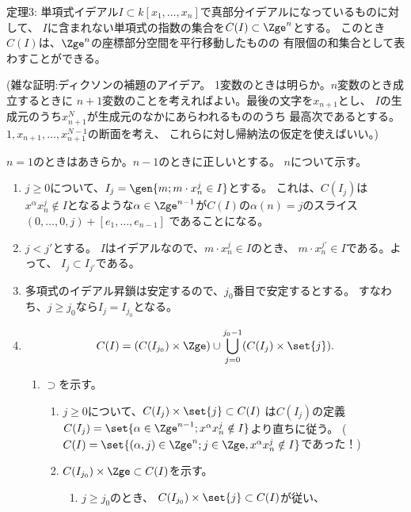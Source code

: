 \begin{framed}
  定理3:
  単項式イデアル$I\subset k[x_1,\dots,x_n]$で真部分イデアルになっているものに対して、
  $I$に含まれない単項式の指数の集合を$C(I) \subset \Zge^n$とする。
  このとき$C(I)$は、$\Zge^n$の座標部分空間を平行移動したものの
  有限個の和集合として表わすことができる。
\end{framed}
(雑な証明:ディクソンの補題のアイデア。
1変数のときは明らか。$n$変数のとき成立するときに
$n+1$変数のことを考えればよい。最後の文字を$x_{n+1}$とし、
$I$の生成元のうち$x_{n+1}^N$が生成元のなかにあらわれるもののうち
最高次であるとする。$1,x_{n+1},\dots, x_{n+1}^{N-1}$の断面を考え、
これらに対し帰納法の仮定を使えばいい。)
\begin{myproof}
  $n=1$のときはあきらか。$n-1$のときに正しいとする。
  $n$について示す。

  \begin{enumerate}
    \item $j\ge 0$について、$I_j = \gen{m; m\cdot x_n^j \in I}$とする。
    これは、$C(I_j)$は$x^\alpha x_n^j \notin I$となるような$\alpha \in \Zge^{n-1}$が$C(I)$の$\alpha(n) = j$のスライス
    $(0,\dots,0,j) + [e_1,\dots,e_{n-1}]$
    であることになる。
    \item $j < j'$とする。
    $I$はイデアルなので、$m\cdot x_n^j \in I$のとき、
    $m\cdot x_n^{j'} \in I$である。よって、
    $I_j \subset I_{j'}$である。
    \item
    多項式のイデアル昇鎖は安定するので、$j_0$番目で安定するとする。
    すなわち、$j\ge j_0$なら$I_j = I_{j_0}$となる。
    \item
    \begin{align}
      C(I) = (C(I_{j_0})\times \Zge) \cup \bigcup_{j=0}^{j_0-1}(C(I_j)\times \set{j}).
    \end{align}
    \begin{enumerate}
      \item $\supset$を示す。
      \begin{enumerate}
        \item $j\ge 0$について、$C(I_j) \times \set{j} \subset C(I)$
        は$C(I_j)$の定義$C(I_j) = \set{\alpha \in \Zge^{n-1}; x^\alpha x_n^j \notin I}$より直ちに従う。
        ($C(I)= \set{(\alpha,j) \in \Zge^n; j \in \Zge, x^\alpha x_n^j \notin I}$であった！)
        \item $C(I_{j_0})\times \Zge \subset C(I)$を示す。
        \begin{enumerate}
          \item          $j\ge j_0$のとき、
                  $C(I_{j_0}) \times \set{j}\subset C(I)$が従い、

\end{enumerate}
\end{enumerate}
\end{enumerate}
\end{enumerate}
\end{myproof}
